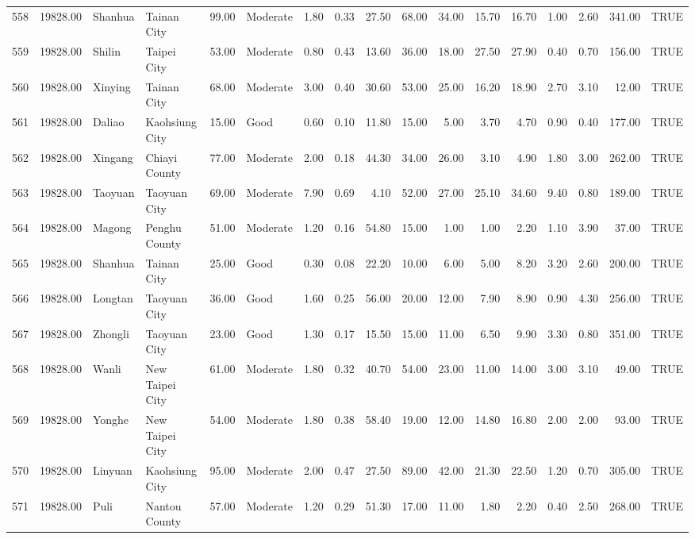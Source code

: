 \begin{table}[ht]
\begin{tabular}{rrllrlrrrrrrrrrrl}
  558 & 19828.00 & Shanhua & Tainan City & 99.00 & Moderate & 1.80 & 0.33 & 27.50 & 68.00 & 34.00 & 15.70 & 16.70 & 1.00 & 2.60 & 341.00 & TRUE \\ 
  559 & 19828.00 & Shilin & Taipei City & 53.00 & Moderate & 0.80 & 0.43 & 13.60 & 36.00 & 18.00 & 27.50 & 27.90 & 0.40 & 0.70 & 156.00 & TRUE \\ 
  560 & 19828.00 & Xinying & Tainan City & 68.00 & Moderate & 3.00 & 0.40 & 30.60 & 53.00 & 25.00 & 16.20 & 18.90 & 2.70 & 3.10 & 12.00 & TRUE \\ 
  561 & 19828.00 & Daliao & Kaohsiung City & 15.00 & Good & 0.60 & 0.10 & 11.80 & 15.00 & 5.00 & 3.70 & 4.70 & 0.90 & 0.40 & 177.00 & TRUE \\ 
  562 & 19828.00 & Xingang & Chiayi County & 77.00 & Moderate & 2.00 & 0.18 & 44.30 & 34.00 & 26.00 & 3.10 & 4.90 & 1.80 & 3.00 & 262.00 & TRUE \\ 
  563 & 19828.00 & Taoyuan & Taoyuan City & 69.00 & Moderate & 7.90 & 0.69 & 4.10 & 52.00 & 27.00 & 25.10 & 34.60 & 9.40 & 0.80 & 189.00 & TRUE \\ 
  564 & 19828.00 & Magong & Penghu County & 51.00 & Moderate & 1.20 & 0.16 & 54.80 & 15.00 & 1.00 & 1.00 & 2.20 & 1.10 & 3.90 & 37.00 & TRUE \\ 
  565 & 19828.00 & Shanhua & Tainan City & 25.00 & Good & 0.30 & 0.08 & 22.20 & 10.00 & 6.00 & 5.00 & 8.20 & 3.20 & 2.60 & 200.00 & TRUE \\ 
  566 & 19828.00 & Longtan & Taoyuan City & 36.00 & Good & 1.60 & 0.25 & 56.00 & 20.00 & 12.00 & 7.90 & 8.90 & 0.90 & 4.30 & 256.00 & TRUE \\ 
  567 & 19828.00 & Zhongli & Taoyuan City & 23.00 & Good & 1.30 & 0.17 & 15.50 & 15.00 & 11.00 & 6.50 & 9.90 & 3.30 & 0.80 & 351.00 & TRUE \\ 
  568 & 19828.00 & Wanli & New Taipei City & 61.00 & Moderate & 1.80 & 0.32 & 40.70 & 54.00 & 23.00 & 11.00 & 14.00 & 3.00 & 3.10 & 49.00 & TRUE \\ 
  569 & 19828.00 & Yonghe & New Taipei City & 54.00 & Moderate & 1.80 & 0.38 & 58.40 & 19.00 & 12.00 & 14.80 & 16.80 & 2.00 & 2.00 & 93.00 & TRUE \\ 
  570 & 19828.00 & Linyuan & Kaohsiung City & 95.00 & Moderate & 2.00 & 0.47 & 27.50 & 89.00 & 42.00 & 21.30 & 22.50 & 1.20 & 0.70 & 305.00 & TRUE \\ 
  571 & 19828.00 & Puli & Nantou County & 57.00 & Moderate & 1.20 & 0.29 & 51.30 & 17.00 & 11.00 & 1.80 & 2.20 & 0.40 & 2.50 & 268.00 & TRUE \\ 

\end{tabular}
\end{table}

